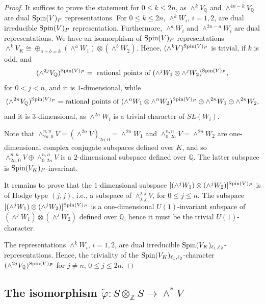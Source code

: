 \documentclass[12pt]{amsart}
\numberwithin{equation}{subsection}
\theoremstyle{plain}
\theoremstyle{definition}
\newcommand{\QQ}{{\mathbb Q}}
\newcommand{\ZZ}{{\mathbb Z}}
\newcommand{\Spin}{{\rm Spin}}
\begin{document}
\begin{proof}
It suffices to prove the statement for $0\leq k\leq 2n$, 
as $\wedge^kV_\QQ$ and $\wedge^{4n-k}V_\QQ$ are dual $\Spin(V)_P$ representations.
 For $0\leq k \leq 2n$, $\wedge^kW_i$, $i=1,2$, are dual irreducible $\Spin(V)_P$ representation. 
Furthermore, $\wedge^aW_i$ and $\wedge^{2n-a}W_i$ are dual representations. We have an isomorphism of $\Spin(V)_P$ representations $\wedge^kV_K\cong \oplus_{a+b=k}(\wedge^aW_1)\otimes(\wedge^bW_2)$.
Hence, $(\wedge^kV)^{\Spin(V)_P}$ is trivial, if $k$ is odd, and
\[
(\wedge^{2j}V_\QQ)^{\Spin(V)_P}= \ \mbox{rational points of} \ (\wedge^jW_1\otimes\wedge^jW_2)^{\Spin(V)_P},
\]
for $0<j<n$, and it is $1$-dimensional, while
\[
(\wedge^{2n}V_\QQ)^{\Spin(V)_P}=
 \mbox{rational points of} \ (\wedge^nW_1\otimes\wedge^nW_2)^{\Spin(V)_P}
 \oplus \wedge^{2n}W_1\oplus \wedge^{2n}W_2,
\]
and it is $3$-dimensional, as $\wedge^{2n}W_i$ is a trivial character of $SL(W_i)$.

Note that $\wedge^{n,n}_{2n,0}V=(\wedge ^{2n}V)_{2n,0}=\wedge^{2n}W_1$ and $\wedge^{n,n}_{0,2n}V=\wedge^{2n}W_2$ are one-dimensional complex conjugate subspaces defined over $K$, and so $\wedge^{n,n}_{2n,0}V\oplus \wedge^{n,n}_{0,2n}V$ is a $2$-dimensional subspace defined over $\QQ$. The latter subspace is $\Spin(V_K)_P$-invariant.

It remains to prove that the $1$-dimensional subspace $[(\wedge^jW_1)\otimes(\wedge^jW_2)]^{\Spin(V)_P}$ is of Hodge type $(j,j)$, i.e., a subspace of $\wedge^{j,j}_{j,j}V$, for $0\leq j\leq n$. The subspace $[(\wedge^jW_1)\otimes(\wedge^jW_2)]^{\Spin(V)_P}$ is a one-dimensional $U(1)$-invariant subspace of 
$(\wedge^jW_1)\otimes(\wedge^jW_2)$ defined over $\QQ$, hence it must be the trivial $U(1)$-character.

The representations $\wedge^kW_i$, $i=1,2$, are dual irreducible $\Spin(V_K)_{\ell_1,\ell_2}$-representations. Hence, the triviality of the $\Spin(V_K)_{\ell_1,\ell_2}$-character $(\wedge^{2j}V_\QQ)^{\Spin(V)_P}$ for $j\neq n$, $0\leq j\leq 2n$.
\end{proof}


% 
\subsection{The isomorphism $\tilde{\varphi}:S\otimes_\ZZ S\rightarrow \wedge^*V$}
\label{subsection-the-isomorphism-tilde-varphi}
 
\end{document}
